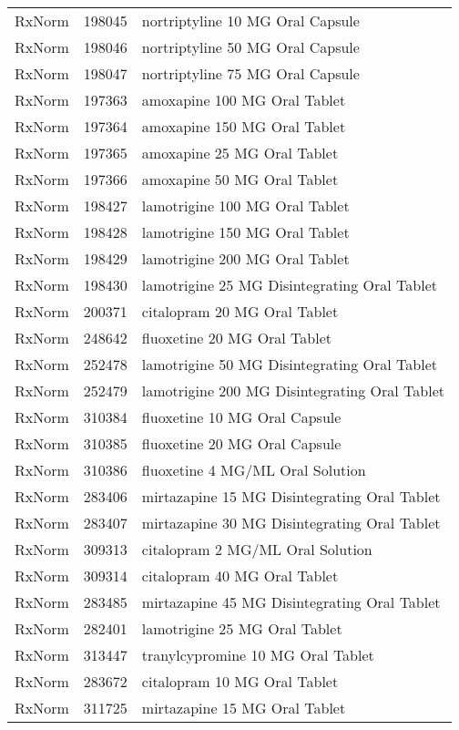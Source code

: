 \begin{longtable}{p{}p{}p{}}
  RxNorm & 198045 & nortriptyline 10 MG Oral Capsule \\ 
  RxNorm & 198046 & nortriptyline 50 MG Oral Capsule \\ 
  RxNorm & 198047 & nortriptyline 75 MG Oral Capsule \\ 
  RxNorm & 197363 & amoxapine 100 MG Oral Tablet \\ 
  RxNorm & 197364 & amoxapine 150 MG Oral Tablet \\ 
  RxNorm & 197365 & amoxapine 25 MG Oral Tablet \\ 
  RxNorm & 197366 & amoxapine 50 MG Oral Tablet \\ 
  RxNorm & 198427 & lamotrigine 100 MG Oral Tablet \\ 
  RxNorm & 198428 & lamotrigine 150 MG Oral Tablet \\ 
  RxNorm & 198429 & lamotrigine 200 MG Oral Tablet \\ 
  RxNorm & 198430 & lamotrigine 25 MG Disintegrating Oral Tablet \\ 
  RxNorm & 200371 & citalopram 20 MG Oral Tablet \\ 
  RxNorm & 248642 & fluoxetine 20 MG Oral Tablet \\ 
  RxNorm & 252478 & lamotrigine 50 MG Disintegrating Oral Tablet \\ 
  RxNorm & 252479 & lamotrigine 200 MG Disintegrating Oral Tablet \\ 
  RxNorm & 310384 & fluoxetine 10 MG Oral Capsule \\ 
  RxNorm & 310385 & fluoxetine 20 MG Oral Capsule \\ 
  RxNorm & 310386 & fluoxetine 4 MG/ML Oral Solution \\ 
  RxNorm & 283406 & mirtazapine 15 MG Disintegrating Oral Tablet \\ 
  RxNorm & 283407 & mirtazapine 30 MG Disintegrating Oral Tablet \\ 
  RxNorm & 309313 & citalopram 2 MG/ML Oral Solution \\ 
  RxNorm & 309314 & citalopram 40 MG Oral Tablet \\ 
  RxNorm & 283485 & mirtazapine 45 MG Disintegrating Oral Tablet \\ 
  RxNorm & 282401 & lamotrigine 25 MG Oral Tablet \\ 
  RxNorm & 313447 & tranylcypromine 10 MG Oral Tablet \\ 
  RxNorm & 283672 & citalopram 10 MG Oral Tablet \\ 
  RxNorm & 311725 & mirtazapine 15 MG Oral Tablet \\ 

\end{longtable}
